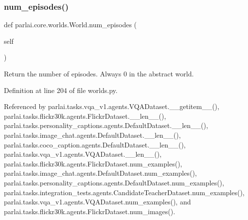 \subsubsection{\texorpdfstring{num\+\_\+episodes()}{num\_episodes()}}
{\footnotesize\ttfamily def parlai.\+core.\+worlds.\+World.\+num\+\_\+episodes (\begin{DoxyParamCaption}\item[{}]{self }\end{DoxyParamCaption})}

\begin{DoxyVerb}Return the number of episodes. Always 0 in the abstract world.\end{DoxyVerb}
 

Definition at line 204 of file worlds.\+py.



Referenced by parlai.\+tasks.\+vqa\+\_\+v1.\+agents.\+V\+Q\+A\+Dataset.\+\_\+\+\_\+getitem\+\_\+\+\_\+(), parlai.\+tasks.\+flickr30k.\+agents.\+Flickr\+Dataset.\+\_\+\+\_\+len\+\_\+\+\_\+(), parlai.\+tasks.\+personality\+\_\+captions.\+agents.\+Default\+Dataset.\+\_\+\+\_\+len\+\_\+\+\_\+(), parlai.\+tasks.\+image\+\_\+chat.\+agents.\+Default\+Dataset.\+\_\+\+\_\+len\+\_\+\+\_\+(), parlai.\+tasks.\+coco\+\_\+caption.\+agents.\+Default\+Dataset.\+\_\+\+\_\+len\+\_\+\+\_\+(), parlai.\+tasks.\+vqa\+\_\+v1.\+agents.\+V\+Q\+A\+Dataset.\+\_\+\+\_\+len\+\_\+\+\_\+(), parlai.\+tasks.\+flickr30k.\+agents.\+Flickr\+Dataset.\+num\+\_\+examples(), parlai.\+tasks.\+image\+\_\+chat.\+agents.\+Default\+Dataset.\+num\+\_\+examples(), parlai.\+tasks.\+personality\+\_\+captions.\+agents.\+Default\+Dataset.\+num\+\_\+examples(), parlai.\+tasks.\+integration\+\_\+tests.\+agents.\+Candidate\+Teacher\+Dataset.\+num\+\_\+examples(), parlai.\+tasks.\+vqa\+\_\+v1.\+agents.\+V\+Q\+A\+Dataset.\+num\+\_\+examples(), and parlai.\+tasks.\+flickr30k.\+agents.\+Flickr\+Dataset.\+num\+\_\+images().

